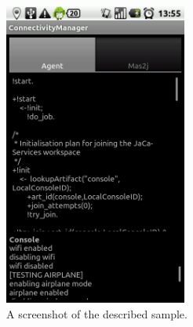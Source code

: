 \documentclass[11pt]{report}
\begin{document}
\begin{figure}[!ht]
\begin{center}
\includegraphics[width=6cm]{images/test_connectivity_gui.png}
\end{center}
\caption{A screenshot of the described sample.}
\end{figure}

\clearpage
\end{document}
